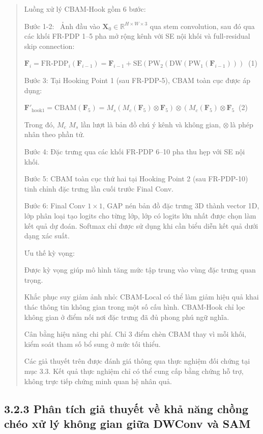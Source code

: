 \documentclass[
  12pt,
  a4paper,
]{report}
\begin{document}
\begin{quote}
Luồng xử lý CBAM-Hook gồm 6 bước:

Bước 1-2: ~Ảnh đầu vào
\(\mathbf{X}_{0} \in \mathbb{R}^{H \times W \times 3}\) qua stem
convolution, sau đó qua các khối FR-PDP 1--5 pha mở rộng kênh với SE nội khối
và full-residual skip connection:

\(\mathbf{F}_{i} = \text{FR-PDP}_{i}\left( \mathbf{F}_{i - 1} \right) = \mathbf{F}_{i - 1} + \text{SE}\left( \text{PW}_{2}\left( \text{DW}\left( \text{PW}_{1}\left( \mathbf{F}_{i - 1} \right) \right) \right) \right.\ \)
(1)

Bước 3: Tại Hooking Point 1 (sau FR-PDP-5), CBAM toàn cục được áp dụng:

\(\mathbf{F}'_{\text{hook1}} = \text{CBAM}\left( \mathbf{F}_{5} \right) = M_{s}\left( M_{c}\left( \mathbf{F}_{5} \right) \otimes \mathbf{F}_{5} \right) \otimes \left( M_{c}\left( \mathbf{F}_{5} \right) \otimes \mathbf{F}_{5} \right.\ \)
(2)

Trong đó, \(M_{c}\) \(M_{s}\) lần lượt là bản đồ chú ý kênh và không
gian, \(\otimes \ \)là phép nhân theo phần tử.

Bước 4: Đặc trưng qua các khối FR-PDP 6--10 pha thu hẹp với SE nội khối.

Bước 5: CBAM toàn cục thứ hai tại Hooking Point 2 (sau FR-PDP-10) tinh
chỉnh đặc trưng lần cuối trước Final Conv.

Bước 6: Final Conv \(1 \times 1\), GAP nén bản đồ đặc trưng 3D thành vector 1D, lớp phân loại tạo
logits cho từng lớp, lớp có logits lớn nhất được chọn làm kết quả dự
đoán. Softmax chỉ được sử dụng khi cần biểu diễn kết quả dưới dạng xác
suất.

Ưu thế kỳ vọng:

Được kỳ vọng giúp mô hình tăng mức tập trung vào vùng đặc trưng quan
trọng.

Khắc phục suy giảm ảnh nhỏ: CBAM-Local có thể làm giảm hiệu quả khai
thác thông tin không gian trong một số cấu hình. CBAM-Hook chỉ lọc không
gian ở điểm nối nơi đặc trưng đã đủ phong phú ngữ nghĩa.

Cân bằng hiệu năng chi phí. Chỉ 3 điểm chèn CBAM thay vì mỗi khối, kiểm
soát tham số bổ sung ở mức tối thiểu.

Các giả thuyết trên được đánh giá thông qua thực nghiệm đối chứng tại
mục 3.3. Kết quả thực nghiệm chỉ có thể cung cấp bằng chứng hỗ trợ,
không trực tiếp chứng minh quan hệ nhân quả.
\end{quote}

\subsection*{3.2.3 Phân tích giả thuyết về khả năng chồng chéo xử lý
không gian giữa DWConv và
SAM}\label{phuxe2n-tuxedch-giux1ea3-thuyux1ebft-vux1ec1-khux1ea3-nux103ng-chux1ed3ng-chuxe9o-xux1eed-luxfd-khuxf4ng-gian-giux1eefa-dwconv-vuxe0-sam}
\end{document}
